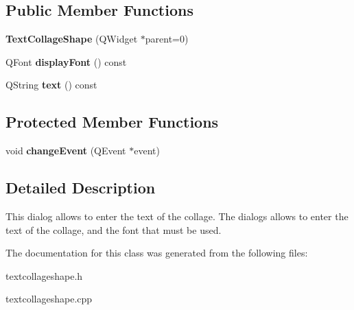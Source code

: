 \subsection*{Public Member Functions}
\begin{DoxyCompactItemize}
\item 
\hypertarget{class_text_collage_shape_a3db81d793eff15ed534279dd5d186876}{
{\bfseries TextCollageShape} (QWidget $\ast$parent=0)}
\label{class_text_collage_shape_a3db81d793eff15ed534279dd5d186876}

\item 
\hypertarget{class_text_collage_shape_a9b45888e5633e6b44e80a48d733015a5}{
QFont {\bfseries displayFont} () const }
\label{class_text_collage_shape_a9b45888e5633e6b44e80a48d733015a5}

\item 
\hypertarget{class_text_collage_shape_a5af16ce984def164f8175e78c8e2853b}{
QString {\bfseries text} () const }
\label{class_text_collage_shape_a5af16ce984def164f8175e78c8e2853b}

\end{DoxyCompactItemize}
\subsection*{Protected Member Functions}
\begin{DoxyCompactItemize}
\item 
\hypertarget{class_text_collage_shape_a71e2c487a83521f7afaee8d690d34252}{
void {\bfseries changeEvent} (QEvent $\ast$event)}
\label{class_text_collage_shape_a71e2c487a83521f7afaee8d690d34252}

\end{DoxyCompactItemize}


\subsection{Detailed Description}
This dialog allows to enter the text of the collage. The dialogs allows to enter the text of the collage, and the font that must be used. 

The documentation for this class was generated from the following files:\begin{DoxyCompactItemize}
\item 
textcollageshape.h\item 
textcollageshape.cpp\end{DoxyCompactItemize}
